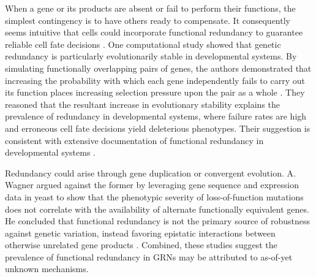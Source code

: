 When a gene or its products are absent or fail to perform their functions, the simplest contingency is to have others ready to compensate. It consequently seems intuitive that cells could incorporate functional redundancy to guarantee reliable cell fate decisions \cite{Hartman2001,McAdams1999}. One computational study showed that genetic redundancy is particularly evolutionarily stable in developmental systems. By simulating functionally overlapping pairs of genes, the authors demonstrated that increasing the probability with which each gene independently fails to carry out its function places increasing selection pressure upon the pair as a whole \cite{Nowak1997}. They reasoned that the resultant increase in evolutionary stability explains the prevalence of redundancy in developmental systems, where failure rates are high and erroneous cell fate decisions yield deleterious phenotypes. Their suggestion is consistent with extensive documentation of functional redundancy in developmental systems \cite{Kitano2004}. 

Redundancy could arise through gene duplication or convergent evolution. A. Wagner argued against the former by leveraging gene sequence and expression data in yeast to show that the phenotypic severity of loss-of-function mutations does not correlate with the availability of alternate functionally equivalent genes. He concluded that functional redundancy is not the primary source of robustness against genetic variation, instead favoring epistatic interactions between otherwise unrelated gene products \cite{Wagner2000}. Combined, these studies suggest the prevalence of functional redundancy in GRNs may be attributed to as-of-yet unknown mechanisms.
